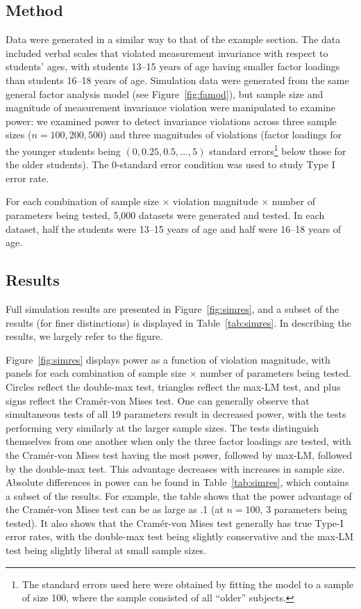 \documentclass[man]{apa}
\begin{document}
\subsection{Method}
Data were generated in a similar way to that of 
the example section.
The data included verbal scales that violated measurement invariance
with respect to students' ages, with students 13--15 years of age
having smaller factor loadings than students 16--18 years of age.  
Simulation data were generated from the same general factor analysis
model (see Figure~\ref{fig:famod}), but sample size and magnitude
of measurement 
invariance violation were manipulated to examine power:
we examined power to detect 
invariance violations across three sample sizes ($n=100,
200, 500$) and three magnitudes of violations (factor loadings
for the younger students being $(0, 0.25, 0.5, \dots, 5)$ standard
errors\footnote{The standard errors used here were
  obtained by fitting
  the model to a sample of size 100, where the sample consisted of all
  ``older'' subjects.} below 
those for the older students).  The 0-standard error condition was
used to study Type I error rate.

For each combination of sample size $\times$
violation magnitude $\times$ number of parameters being tested,
5,000 datasets were generated and tested.  In each dataset, half the
students were 13--15 
years of age and half were 16--18 years of age.

\subsection{Results}
Full simulation results are presented in Figure~\ref{fig:simres}, and
a subset of the results (for finer distinctions) is displayed in
Table~\ref{tab:simres}.  In describing the results, we largely refer
to the figure.

Figure~\ref{fig:simres} displays power as a function of violation
magnitude, with panels for each combination of sample size $\times$
number of parameters being tested.  
Circles reflect the double-max test, triangles reflect the max-LM
test, and plus signs reflect the Cram{\'e}r-von Mises test.  One can
generally observe that simultaneous tests of all 19 parameters
result in decreased power, with the tests performing very similarly at
the larger sample sizes.  The tests distinguish themselves from one
another when only the three factor loadings are tested, with the
Cram\'{e}r-von Mises test having the most power, followed by max-LM,
followed by the double-max test.  This advantage decreases with
increases in sample size.  
Absolute differences in power can be found in Table~\ref{tab:simres},
which contains a subset of the results.  For example, the table shows that the
power advantage of the Cram\'{e}r-von
Mises test can be as large as .1 (at $n=100$, 3 parameters being
tested).  It also shows that the Cram\'{e}r-von Mises test generally
has true Type-I error rates, with the double-max test being slightly
conservative and the max-LM test being slightly liberal at small
sample sizes.
\end{document}
